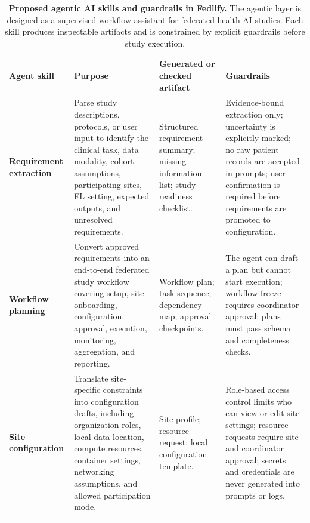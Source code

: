 \documentclass[preprint,5p, 10pt, times]{elsarticle}
\begin{document}
\begin{table}[t]
\centering
\caption{\textbf{Proposed agentic AI skills and guardrails in Fedlify.} The agentic layer is designed as a supervised workflow assistant for federated health AI studies. Each skill produces inspectable artifacts and is constrained by explicit guardrails before study execution.}
\label{tab:agentic_ai_skills_guardrails}
\scriptsize
\setlength{\tabcolsep}{3pt}
\renewcommand{\arraystretch}{1.15}
\begin{tabularx}{\textwidth}{
>{\raggedright\arraybackslash}p{2.8cm}
>{\raggedright\arraybackslash}X
>{\raggedright\arraybackslash}X
>{\raggedright\arraybackslash}X}
\toprule
\textbf{Agent skill} & \textbf{Purpose} & \textbf{Generated or checked artifact} & \textbf{Guardrails} \\
\midrule

\textbf{Requirement extraction}
& Parse study descriptions, protocols, or user input to identify the clinical task, data modality, cohort assumptions, participating sites, FL setting, expected outputs, and unresolved requirements.
& Structured requirement summary; missing-information list; study-readiness checklist.
& Evidence-bound extraction only; uncertainty is explicitly marked; no raw patient records are accepted in prompts; user confirmation is required before requirements are promoted to configuration. \\
\addlinespace[3pt]

\textbf{Workflow planning}
& Convert approved requirements into an end-to-end federated study workflow covering setup, site onboarding, configuration, approval, execution, monitoring, aggregation, and reporting.
& Workflow plan; task sequence; dependency map; approval checkpoints.
& The agent can draft a plan but cannot start execution; workflow freeze requires coordinator approval; plans must pass schema and completeness checks. \\
\addlinespace[3pt]

\textbf{Site configuration}
& Translate site-specific constraints into configuration drafts, including organization roles, local data location, compute resources, container settings, networking assumptions, and allowed participation mode.
& Site profile; resource request; local configuration template.
& Role-based access control limits who can view or edit site settings; resource requests require site and coordinator approval; secrets and credentials are never generated into prompts or logs. \\
\addlinespace[3pt]


\end{tabularx}
\end{table}
\end{document}

